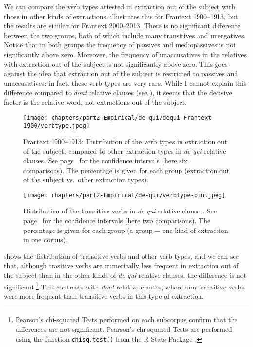 We can compare the verb types attested in extraction out of the subject with those in other kinds of extractions.  illustrates this for Frantext 1900--1913, but the results are similar for Frantext 2000--2013. There is no significant difference between the two groups, both of which include many transitives and unergatives. Notice that in both groups the frequency of passives and mediopassives is not significantly above zero. Moreover, the frequency of unaccusatives in the relatives with extraction out of the subject is not significantly above zero. This goes against the idea that extraction out of the subject is restricted to passives and unaccusatives: in fact, these verb types are very rare. While I cannot explain this difference compared to \emph{dont} relative clauses (see ), it seems that the decisive factor is the relative word, not extractions out of the subject.


\begin{figure}
    \texttt{[image: chapters/part2-Empirical/de-qui/dequi-Frantext-1900/verbtype.jpeg]}
    \caption{Frantext 1900--1913: Distribution of the verb types in extraction out of the subject, compared to other extraction types in \emph{de qui} relative clauses. See page~\pageref{ch:conf-intervals-binomial} for the confidence intervals (here six comparisons). The percentage is given for each group (extraction out of the subject vs.\ other extraction types).}
    \label{fig:dequi-Frantext1900-verbtype}
\end{figure}

\begin{figure}
    \texttt{[image: chapters/part2-Empirical/de-qui/verbtype-bin.jpeg]}
    \caption{Distribution of the transitive verbs in \emph{de qui} relative clauses. See page~\pageref{ch:conf-intervals-binomial} for the confidence intervals (here two comparisons). The percentage is given for each group (a group = one kind of extraction in one corpus).}
    \label{fig:dequi-trans}
\end{figure}

 shows the distribution of transitive verbs and other verb types, and we can see that, although trasitive verbs are numerically less frequent in extraction out of the subject than in the other kinds of \emph{de qui} relative clauses, the difference is not significant.\footnote{Pearson's chi-squared Tests performed on each subcorpus confirm that the differences are not significant. Pearson's chi-squared Tests are performed using the function \texttt{chisq.test()} from the R Stats Package \citep{R}.} This contrasts with \textit{dont} relative clauses, where non-transitive verbs were more frequent than transitive verbs in this type of extraction.

